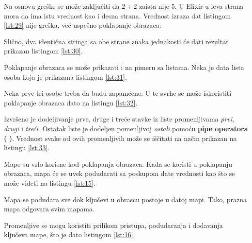 \documentclass[12pt,oneside]{memoir}
\begin{document}


Na osnovu greške se može zaključiti da $2 + 2$ zaista nije 5. U Elixir-u leva strana mora da ima istu vrednost kao i desna strana. Vrednost izraza dat listingom \ref{lst:29} nije greška, već uspešno poklapanje obrazaca:



Slično, dva identična stringa sa obe strane znaka jednakosti će dati rezultat prikazan listingom \ref{lst:30}.



Poklapanje obrazaca se može prikazati i na pimeru sa listama. Neka je data lista osoba koja je prikazana listingom \ref{lst:31}.



Neka prve tri osobe treba da budu zapamćene. U te svrhe se može iskoristiti poklapanje obrazaca dato na listingu \ref{lst:32}.



Izvršeno je dodeljivanje prve, druge i treće stavke iz liste promenljivama \textit{prvi}, \textit{drugi} i \textit{treći}. Ostatak liste je dodeljen pomenljivoj \textit{ostali} pomoću \textbf{pipe operatora (|)}. Vrednost svake od ovih promenljivih može se iščitati na način prikazan na listingu \ref{lst:33}.



Mape su vrlo korisne kod poklapanja obrazaca. Kada se koristi u poklapanju obrazaca, mapa će se uvek podudarati sa poskupom date vrednosti kao što se može videti na listingu \ref{lst:15}.
 


\noindent Mapa se podudara sve dok ključevi u obrascu postoje u datoj mapi. Tako, prazna mapa odgovara svim mapama.

Promenljive se mogu koristiti prilikom pristupa, podudaranja i dodavanja ključeva mape, što je dato listingom \ref{lst:16}.
\end{document}
